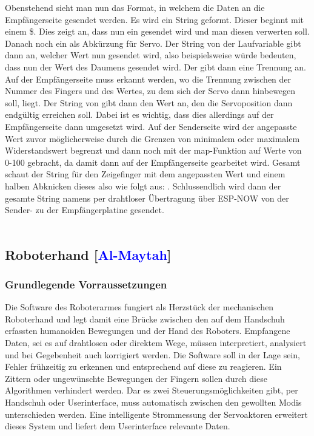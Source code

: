 \documentclass[titlepage,12pt,twoside]{article}
\begin{document}
\hfill \break
\normalsize
Obenstehend sieht man nun das Format, in welchem die Daten an die Empfängerseite 
gesendet werden. Es wird ein String geformt. Dieser beginnt mit einem \$. Dies zeigt 
an, dass nun ein  gesendet wird und man diesen verwerten soll. Danach noch 
ein  als Abkürzung für Servo. Der String von der Laufvariable  gibt dann an, 
welcher Wert nun gesendet wird, also beispielsweise  würde bedeuten, dass nun 
der Wert des Daumens gesendet wird. Der gibt dann eine Trennung an. Auf der 
Empfängerseite muss erkannt werden, wo die Trennung zwischen der Nummer des Fingers 
und des Wertes, zu dem sich der Servo dann hinbewegen soll, liegt. Der String von 
 gibt dann den Wert an, den die Servoposition dann endgültig 
erreichen soll. Dabei ist es wichtig, dass dies allerdings auf der Empfängerseite 
dann umgesetzt wird. Auf der Senderseite wird der angepasste Wert zuvor 
möglicherweise durch die Grenzen von minimalem oder maximalem Widerstandswert 
begrenzt und dann noch mit der map-Funktion auf Werte von 0-100 gebracht, da damit 
dann auf der Empfängerseite gearbeitet wird. Gesamt schaut der String für den 
Zeigefinger mit dem angepassten Wert und einem halben Abknicken dieses also wie 
folgt aus: . Schlussendlich wird dann der gesamte String namens 
 per drahtloser Übertragung über ESP-NOW von der Sender- zu der 
Empfängerplatine gesendet. \\
\\

\newpage
\subsection{Roboterhand [\textcolor{blue}{Al-Maytah}]}

\subsubsection{Grundlegende Vorraussetzungen}
Die Software des Roboterarmes fungiert als Herzstück der mechanischen Roboterhand und legt damit eine Brücke zwischen den auf dem Handschuh erfassten 
humanoiden Bewegungen und der Hand des Roboters. Empfangene Daten, sei es auf drahtlosen oder direktem Wege, müssen interpretiert, analysiert und bei 
Gegebenheit auch korrigiert werden. Die Software soll in der Lage sein, Fehler frühzeitig zu erkennen und entsprechend auf diese zu reagieren. Ein Zittern 
oder ungewünschte Bewegungen der Fingern sollen durch diese Algorithmen verhindert werden. Dar es zwei Steuerungsmöglichkeiten gibt, per Handschuh oder 
Userinterface, muss automatisch zwischen den gewollten Modis unterschieden werden. Eine intelligente Strommessung der Servoaktoren erweitert dieses 
System und liefert dem Userinterface relevante Daten. \\
\\
\end{document}

